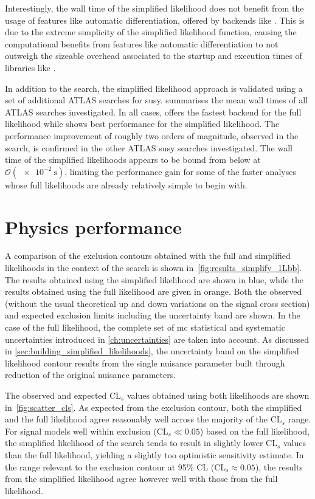 Interestingly, the wall time of the simplified likelihood does not benefit from the usage of features like automatic differentiation, offered by backends like .
This is due to the extreme simplicity of the simplified likelihood function, causing the computational benefits from features like automatic differentiation to not outweigh the sizeable overhead associated to the startup and execution times of libraries like .

In addition to the \onelepton search, the simplified likelihood approach is validated using a set of additional ATLAS searches for \gls{susy}.  summarises the mean wall times of all ATLAS searches investigated. In all cases,  offers the fastest backend for the full likelihood while  shows best performance for the simplified likelihood. The performance improvement of roughly two orders of magnitude, observed in the \onelepton search, is confirmed in the other ATLAS \gls{susy} searches investigated. The wall time of the simplified likelihoods appears to be bound from below at $\mathcal{O}(\SI{e-2}{\second})$, limiting the performance gain for some of the faster analyses whose full likelihoods are already relatively simple to begin with.


\section{Physics performance}\label{sec:physics_performance}

A comparison of the exclusion contours obtained with the full and simplified likelihoods in the context of the \onelepton search is shown in~\cref{fig:results_simplify_1Lbb}. The results obtained using the simplified likelihood are shown in blue, while the results obtained using the full likelihood are given in orange. Both the observed (without the usual theoretical up and down variations on the signal cross section) and expected exclusion limits including the uncertainty band are shown. In the case of the full likelihood, the complete set of \gls{mc} statistical and systematic uncertainties introduced in \cref{ch:uncertainties} are taken into account. As discussed in \cref{sec:building_simplified_likelihoods}, the uncertainty band on the simplified likelihood contour results from the single nuisance parameter built through reduction of the original nuisance parameters.

The observed and expected CL$_s$ values obtained using both likelihoods are shown in~\cref{fig:scatter_cls}. As expected from the exclusion contour, both the simplified and the full likelihood agree reasonably well across the majority of the CL$_s$ range. For signal models well within exclusion ($\mathrm{CL}_s \ll 0.05$) based on the full likelihood, the simplified likelihood of the \onelepton search tends to result in slightly lower CL$_s$ values than the full likelihood, yielding a slightly too optimistic sensitivity estimate. In the range relevant to the exclusion contour at 95\% CL (CL$_s\approx0.05$), the results from the simplified likelihood agree however well with those from the full likelihood.

